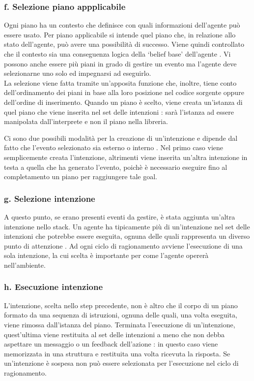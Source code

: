 \subsubsection{f. Selezione piano appplicabile}
Ogni piano ha un contesto che definisce con quali informazioni dell'agente può essere usato.
Per piano applicabile si intende quel piano che, in relazione allo stato dell'agente, può avere una possibilità di successo.
Viene quindi controllato che il contesto sia una conseguenza logica della `belief base' dell'agente \cite{JasonAgentSpeak}. Vi possono anche essere più piani in grado di gestire un evento ma l'agente deve selezionarne uno solo ed impegnarsi ad eseguirlo.
\\
La selezione viene fatta tramite un'apposita funzione che, inoltre, tiene conto dell'ordinamento dei piani in base alla loro posizione nel codice sorgente oppure dell'ordine di inserimento. Quando un piano è scelto, viene creata un'istanza di quel piano che viene inserita nel set delle intenzioni \cite{JasonAgentSpeak}: sarà l'istanza ad essere manipolata dall'interprete e non il piano nella libreria.

Ci sono due possibili modalità per la creazione di un'intenzione e dipende dal fatto che l'evento selezionato sia esterno o interno \cite{JasonAgentSpeak}. Nel primo caso viene semplicemente creata l'intenzione, altrimenti viene inserita un'altra intenzione in testa a quella che ha generato l'evento, poichè è necessario eseguire fino al completamento un piano per raggiungere tale goal.

\subsubsection{g. Selezione intenzione}
A questo punto, se erano presenti eventi da gestire, è stata aggiunta un'altra intenzione nello stack. Un agente ha tipicamente più di un'intenzione nel set delle intenzioni che potrebbe essere eseguita, ognuna delle quali rappresenta un diverso punto di attenzione \cite{JasonAgentSpeak}. Ad ogni ciclo di ragionamento avviene l'esecuzione di una sola intenzione, la cui scelta è importante per come l'agente opererà nell'ambiente.

\subsubsection{h. Esecuzione intenzione}
L'intenzione, scelta nello step precedente, non è altro che il corpo di un piano formato da una sequenza di istruzioni, ognuna delle quali, una volta eseguita, viene rimossa dall'istanza del piano.
Terminata l'esecuzione di un'intenzione, quest'ultima viene restituita al set delle intenzioni a meno che non debba aspettare un messaggio o un feedback dell'azione \cite{JasonAgentSpeak}: in questo caso viene memorizzata in una struttura e restituita una volta ricevuta la risposta.
Se un'intenzione è sospesa non può essere selezionata per l'esecuzione nel ciclo di ragionamento.

